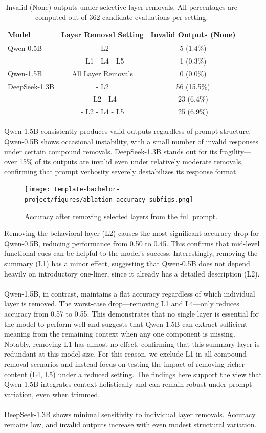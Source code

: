 \documentclass[a4paper]{usiinfbachelorproject}
\begin{document}
\begin{table}[H]
\centering
\small
\begin{tabular}{lcc}
\toprule
\textbf{Model} & \textbf{Layer Removal Setting} & \textbf{Invalid Outputs (None)} \\
\midrule
Qwen-0.5B & - L2 & 5 (1.4\%) \\
          & - L1 - L4 - L5 & 1 (0.3\%) \\
Qwen-1.5B & All Layer Removals & 0 (0.0\%) \\
DeepSeek-1.3B & - L2 & 56 (15.5\%) \\
              & - L2 - L4 & 23 (6.4\%) \\
              & - L2 - L4 - L5 & 25 (6.9\%) \\
\bottomrule
\end{tabular}
\caption{Invalid (None) outputs under selective layer removals. All percentages are computed out of 362 candidate evaluations per setting.}
\label{tab:ablation-invalids}
\end{table}
\noindent
Qwen-1.5B consistently produces valid outputs regardless of prompt structure. Qwen-0.5B shows occasional instability, with a small number of invalid responses under certain compound removals. DeepSeek-1.3B stands out for its fragility—over 15\% of its outputs are invalid even under relatively moderate removals, confirming that prompt verbosity severely destabilizes its response format.

\begin{figure}[H]\centering
  \texttt{[image: template-bachelor-project/figures/ablation\_accuracy\_subfigs.png]}
  \caption{Accuracy after removing selected layers from the full prompt.}
  \label{fig:ablation-accuracy}
\end{figure}
\noindent
Removing the behavioral layer (L2) causes the most significant accuracy drop for Qwen-0.5B, reducing performance from 0.50 to 0.45. This confirms that mid-level functional cues can be helpful to the model's success. Interestingly, removing the summary (L1) has a minor effect, suggesting that Qwen-0.5B does not depend heavily on introductory one-liner, since it already has a detailed description (L2). \\
\\
Qwen-1.5B, in contrast, maintains a flat accuracy regardless of which individual layer is removed. The worst-case drop—removing L1 and L4—only reduces accuracy from 0.57 to 0.55. This demonstrates that no single layer is essential for the model to perform well and suggests that Qwen-1.5B can extract sufficient meaning from the remaining context when any one component is missing. Notably, removing L1 has almost no effect, confirming that this summary layer is redundant at this model size. For this reason, we exclude L1 in all compound removal scenarios and instead focus on testing the impact of removing richer content (L4, L5) under a reduced setting. The findings here support the view that Qwen-1.5B integrates context holistically and can remain robust under prompt variation, even when trimmed. \\
\\
DeepSeek-1.3B shows minimal sensitivity to individual layer removals. Accuracy remains low, and invalid outputs increase with even modest structural variation.
\end{document}
